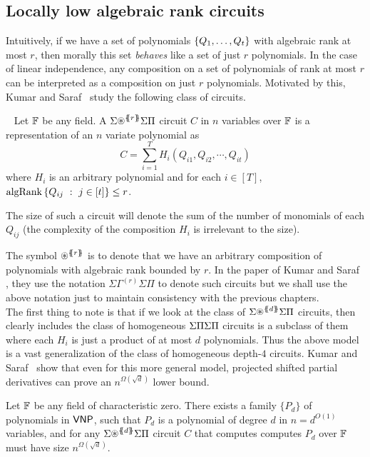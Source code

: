 \subsection{Locally low algebraic rank circuits}


Intuitively, if we have a set of polynomials $\left\{Q_1,\ldots, Q_t\right\}$ with algebraic rank at most $r$, then morally this set \emph{behaves} like a set of just $r$ polynomials. In the case of linear independence, any composition on a set of polynomials of rank at most $r$ can be interpreted as a composition on just $r$ polynomials. Motivated by this, Kumar and Saraf~\cite{KS16lowrank} study the following class of circuits. 

\begin{definition}~\label{def:lb model}
Let $\mathbb{F}$ be any field. A $\SASP{r}$ circuit $C$ in $n$ variables over $\mathbb{F}$ is a representation of an $n$ variate polynomial as 
\[C =  \sum_{i = 1}^T  H_i(Q_{i1},  Q_{i2},  \cdots, Q_{it}) \]  
where $H_i$ is an arbitrary polynomial and for each $i\in [T]$, $\operatorname{\mathrm{algRank}}\left\{{Q_{ij}}\ : \ {j\in [t]}\right\} \leq r$. 

The size of such a circuit will denote the sum of the number of monomials of each $Q_{ij}$ (the complexity of the composition $H_i$ is irrelevant to the size). 
\end{definition}

The symbol $\circast^{\set{\!\!\set{r}\!\!}}$ is to denote that we have an arbitrary composition of polynomials with algebraic rank bounded by $r$.
In the paper of Kumar and Saraf \cite{KS16lowrank}, they use the notation $\Sigma\Gamma^{(r)}\Sigma\Pi$ to denote such circuits but we shall use the above notation just to maintain consistency with the previous chapters. \\

The first thing to note is that if we look at the class of $\SASP{d}$ circuits, then clearly includes the class of homogeneous $\Sigma\Pi\Sigma\Pi$ circuits is a subclass of them where each $H_i$ is just a product of at most $d$ polynomials. Thus the above model is a vast generalization of the class of homogeneous depth-$4$ circuits. Kumar and Saraf~\cite{KS16lowrank} show that even for this more general model, projected shifted partial derivatives can prove an $n^{\Omega(\sqrt{d})}$ lower bound. 

\begin{theorem} \label{thm:locally-lowalgrank}
Let $\mathbb{F}$ be any field of characteristic zero. There exists a family $\{P_d\}$ of polynomials in $\mathsf{VNP}$, such that $P_d$ is a polynomial of degree $d$ in $n = d^{O(1)}$ variables, and for any $\SASP{d}$ circuit $C$ that computes computes $P_d$ over $\mathbb{F}$ must have size $n^{\Omega(\sqrt{d})}$.
\end{theorem} 

